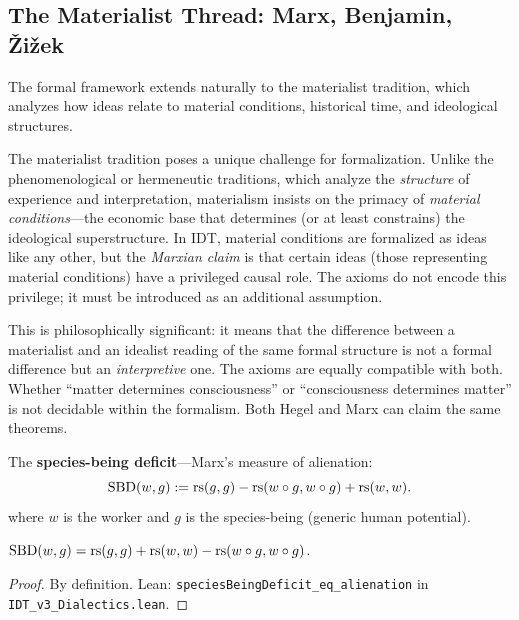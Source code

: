 \subsection{The Materialist Thread: Marx, Benjamin, \v{Z}i\v{z}ek}

The formal framework extends naturally to the materialist tradition, which
analyzes how ideas relate to material conditions, historical time, and
ideological structures.

\begin{remark}
The materialist tradition poses a unique challenge for formalization. Unlike
the phenomenological or hermeneutic traditions, which analyze the
\emph{structure} of experience and interpretation, materialism insists on
the primacy of \emph{material conditions}---the economic base that determines
(or at least constrains) the ideological superstructure. In IDT, material
conditions are formalized as ideas like any other, but the \emph{Marxian
claim} is that certain ideas (those representing material conditions) have
a privileged causal role. The axioms do not encode this privilege; it must
be introduced as an additional assumption.

This is philosophically significant: it means that the difference between
a materialist and an idealist reading of the same formal structure is not
a formal difference but an \emph{interpretive} one. The axioms are
equally compatible with both. Whether ``matter determines consciousness''
or ``consciousness determines matter'' is not decidable within the formalism.
Both Hegel and Marx can claim the same theorems.
\end{remark}

\begin{definition}
\label{def:species-being}
The \textbf{species-being deficit}---Marx's measure of alienation:
\[
\mathrm{SBD}(w, g) := \mathrm{rs}(g, g) - \mathrm{rs}(w \circ g, w \circ g) + \mathrm{rs}(w, w).
\]
where $w$ is the worker and $g$ is the species-being (generic human potential).
\end{definition}

\begin{theorem}
\label{thm:alienation}
$\mathrm{SBD}(w, g) = \mathrm{rs}(g, g) + \mathrm{rs}(w, w) - \mathrm{rs}(w \circ g, w \circ g)$.
\end{theorem}

\begin{proof}
By definition.
Lean: \texttt{speciesBeingDeficit\_eq\_alienation} in
\texttt{IDT\_v3\_Dialectics.lean}.
\end{proof}


